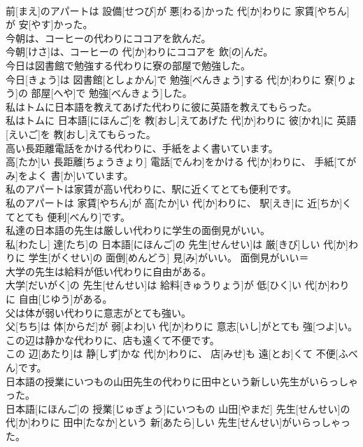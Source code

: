 \documentclass[8pt]{extreport}
\begin{document}
\begin{CJK}{UTF8}{min}
\\	前[まえ]のアパートは 設備[せつび]が 悪[わる]かった 代[か]わりに 家賃[やちん]が 安[やす]かった。	
\\	今朝は、コーヒーの代わりにココアを飲んだ。	
\\	今朝[けさ]は、コーヒーの 代[か]わりにココアを 飲[の]んだ。	
\\	今日は図書館で勉強する代わりに寮の部屋で勉強した。	
\\	今日[きょう]は 図書館[としょかん]で 勉強[べんきょう]する 代[か]わりに 寮[りょう]の 部屋[へや]で 勉強[べんきょう]した。	
\\	私はトムに日本語を教えてあげた代わりに彼に英語を教えてもらった。	
\\	私はトムに 日本語[にほんご]を 教[おし]えてあげた 代[か]わりに 彼[かれ]に 英語[えいご]を 教[おし]えてもらった。	
\\	高い長距離電話をかける代わりに、手紙をよく書いています。	
\\	高[たか]い 長距離[ちょうきょり] 電話[でんわ]をかける 代[か]わりに、 手紙[てがみ]をよく 書[か]いています。	
\\	私のアパートは家賃が高い代わりに、駅に近くてとても便利です。	
\\	私のアパートは 家賃[やちん]が 高[たか]い 代[か]わりに、 駅[えき]に 近[ちか]くてとても 便利[べんり]です。	
\\	私達の日本語の先生は厳しい代わりに学生の面倒見がいい。	
\\	私[わたし] 達[たち]の 日本語[にほんご]の 先生[せんせい]は 厳[きび]しい 代[か]わりに 学生[がくせい]の 面倒[めんどう] 見[み]がいい。	面倒見がいい＝ 
\\	大学の先生は給料が低い代わりに自由がある。	
\\	大学[だいがく]の 先生[せんせい]は 給料[きゅうりょう]が 低[ひく]い 代[か]わりに 自由[じゆう]がある。	
\\	父は体が弱い代わりに意志がとても強い。	
\\	父[ちち]は 体[からだ]が 弱[よわ]い 代[か]わりに 意志[いし]がとても 強[つよ]い。	
\\	この辺は静かな代わりに、店も遠くて不便です。	
\\	この 辺[あたり]は 静[しず]かな 代[か]わりに、 店[みせ]も 遠[とお]くて 不便[ふべん]です。	
\\	日本語の授業にいつもの山田先生の代わりに田中という新しい先生がいらっしゃった。	
\\	日本語[にほんご]の 授業[じゅぎょう]にいつもの 山田[やまだ] 先生[せんせい]の 代[か]わりに 田中[たなか]という 新[あたら]しい 先生[せんせい]がいらっしゃった。	

\end{CJK}
\end{document}
